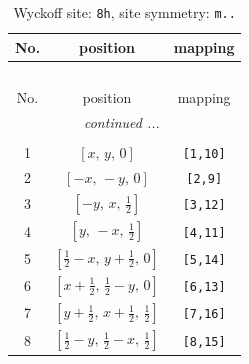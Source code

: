 \documentclass[fleqn,8pt]{jsarticle}
\begin{document}
\begin{longtable}{ccc}
\caption{Wyckoff site: {\tt 8h}, site symmetry: {\tt m..}}
 \\
 \hline \hline
No. & position & mapping \\ \hline \endfirsthead

\multicolumn{2}{l}{\tablename\ \thetable{}} \\
 \hline \hline
No. & position & mapping \\ \hline \endhead

 \hline \hline
\multicolumn{2}{r}{\footnotesize\it continued ...} \\ \endfoot

 \hline \hline
\multicolumn{2}{r}{} \\ \endlastfoot

1 & $\left[ x,\, y,\, 0 \right]$ & {\tt [1,10]} \\ \hline
2 & $\left[ - x,\, - y,\, 0 \right]$ & {\tt [2,9]} \\ \hline
3 & $\left[ - y,\, x,\, \frac{1}{2} \right]$ & {\tt [3,12]} \\ \hline
4 & $\left[ y,\, - x,\, \frac{1}{2} \right]$ & {\tt [4,11]} \\ \hline
5 & $\left[ \frac{1}{2} - x,\, y + \frac{1}{2},\, 0 \right]$ & {\tt [5,14]} \\ \hline
6 & $\left[ x + \frac{1}{2},\, \frac{1}{2} - y,\, 0 \right]$ & {\tt [6,13]} \\ \hline
7 & $\left[ y + \frac{1}{2},\, x + \frac{1}{2},\, \frac{1}{2} \right]$ & {\tt [7,16]} \\ \hline
8 & $\left[ \frac{1}{2} - y,\, \frac{1}{2} - x,\, \frac{1}{2} \right]$ & {\tt [8,15]} \\
\end{longtable}
\renewcommand{\arraystretch}{1.2}
\end{document}
